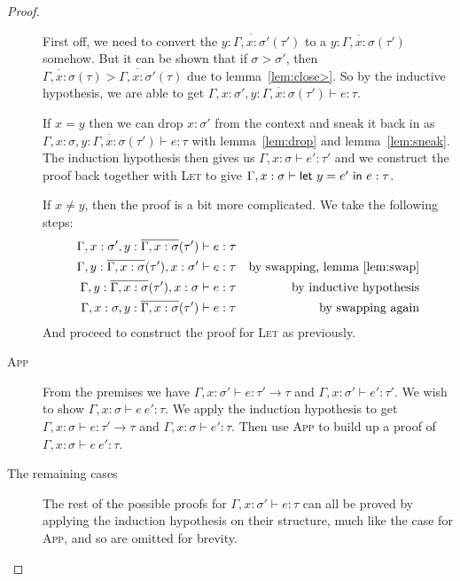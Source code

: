 \begin{proof}
\begin{description}
    First off, we need to convert the $y : \overline{\Gamma , x : \sigma'}(\tau')$ to a
    $y : \overline{\Gamma, x : \sigma}(\tau')$ somehow. But it can be shown that if $\sigma >
    \sigma'$, then $\overline{\Gamma , x : \sigma}(\tau) > \overline{\Gamma , x : \sigma'}(\tau)$ due
    to lemma~\ref{lem:close>}. So by the inductive hypothesis,
    we are able to get $\Gamma , x : \sigma' , y : \overline{\Gamma, x : \sigma}(\tau') \vdash e : \tau$.

    If $x = y$ then we can drop $x :
    \sigma'$ from the context and sneak it back in as $\Gamma , x : \sigma, y :
    \overline{\Gamma, x : \sigma}(\tau') \vdash e : \tau$ with lemma~\ref{lem:drop} and
    lemma~\ref{lem:sneak}. The induction hypothesis then gives us $\Gamma ,
    x : \sigma \vdash e' : \tau'$ and we construct the proof back together with
    \textsc{Let} to give $\Gamma , x : \sigma \vdash \mathsf{let} \ y = e' \ \mathsf{in} \ e : \tau$.

    If $x \neq y$, then the proof is a bit more complicated. We take the
    following steps:
    \begin{align*}
      \Gamma , x : \sigma' , y : \overline{\Gamma, x : \sigma}(\tau') \vdash e : \tau \\
      \Gamma , y : \overline{\Gamma, x : \sigma}(\tau') , x : \sigma' \vdash e : \tau &&  \text{by
                                                            swapping,
                                                            lemma~\ref{lem:swap}}
      \\
      \Gamma , y : \overline{\Gamma, x : \sigma}(\tau') , x : \sigma \vdash e : \tau && \text{by
                                                           inductive
                                                           hypothesis} \\
      \Gamma , x : \sigma , y : \overline{\Gamma, x : \sigma}(\tau') \vdash e : \tau && \text{by swapping again}
    \end{align*}
    And proceed to construct the proof for \textsc{Let} as previously.
  \item[\rm\textsc{App}]
    From the premises we have $\Gamma , x : \sigma' \vdash e : \tau' \rightarrow \tau$ and $\Gamma , x : \sigma' \vdash
    e' : \tau'$. We wish to show $\Gamma , x : \sigma \vdash e \ e' : \tau$.
    We apply the induction hypothesis to get $\Gamma , x : \sigma \vdash e : \tau' \rightarrow \tau$
    and  $\Gamma , x : \sigma \vdash e' : \tau$. Then use \textsc{App} to build up a
    proof of $\Gamma , x : \sigma \vdash e \ e' : \tau$.
  \item[The remaining cases] The rest of the possible proofs for
    $\Gamma , x : \sigma' \vdash e : \tau$ can all be proved by applying the
    induction hypothesis on their structure, much like the case for
    \textsc{App}, and so are omitted for brevity.
  \end{description}
\end{proof}

